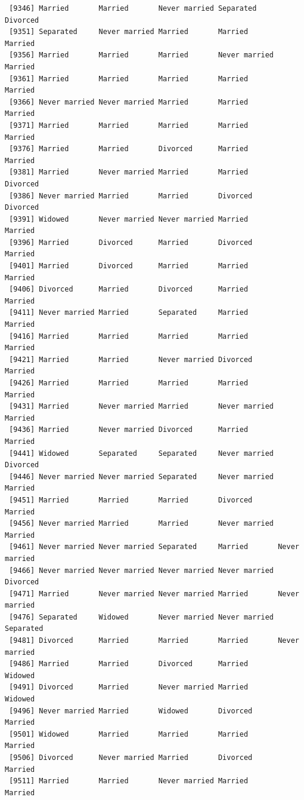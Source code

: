 \documentclass[
  letterpaper,
  DIV=11,
  numbers=noendperiod,
  oneside]{scrartcl}
\begin{document}
\begin{verbatim}
 [9346] Married       Married       Never married Separated     Divorced     
 [9351] Separated     Never married Married       Married       Married      
 [9356] Married       Married       Married       Never married Married      
 [9361] Married       Married       Married       Married       Married      
 [9366] Never married Never married Married       Married       Married      
 [9371] Married       Married       Married       Married       Married      
 [9376] Married       Married       Divorced      Married       Married      
 [9381] Married       Never married Married       Married       Divorced     
 [9386] Never married Married       Married       Divorced      Divorced     
 [9391] Widowed       Never married Never married Married       Married      
 [9396] Married       Divorced      Married       Divorced      Married      
 [9401] Married       Divorced      Married       Married       Married      
 [9406] Divorced      Married       Divorced      Married       Married      
 [9411] Never married Married       Separated     Married       Married      
 [9416] Married       Married       Married       Married       Married      
 [9421] Married       Married       Never married Divorced      Married      
 [9426] Married       Married       Married       Married       Married      
 [9431] Married       Never married Married       Never married Married      
 [9436] Married       Never married Divorced      Married       Married      
 [9441] Widowed       Separated     Separated     Never married Divorced     
 [9446] Never married Never married Separated     Never married Married      
 [9451] Married       Married       Married       Divorced      Married      
 [9456] Never married Married       Married       Never married Married      
 [9461] Never married Never married Separated     Married       Never married
 [9466] Never married Never married Never married Never married Divorced     
 [9471] Married       Never married Never married Married       Never married
 [9476] Separated     Widowed       Never married Never married Separated    
 [9481] Divorced      Married       Married       Married       Never married
 [9486] Married       Married       Divorced      Married       Widowed      
 [9491] Divorced      Married       Never married Married       Widowed      
 [9496] Never married Married       Widowed       Divorced      Married      
 [9501] Widowed       Married       Married       Married       Married      
 [9506] Divorced      Never married Married       Divorced      Married      
 [9511] Married       Married       Never married Married       Married      

\end{verbatim}
\end{document}
